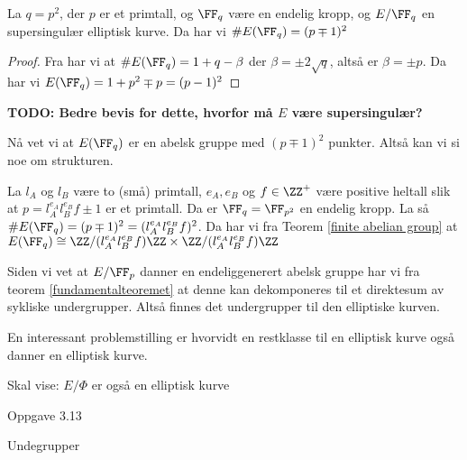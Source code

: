 
\begin{teorem}
La $q = p^2$, der $p$ er et primtall, og $\FF_q$ være en endelig kropp, og $E/\FF_q$ en supersingulær elliptisk kurve. Da har vi $\#E(\FF_q) = (p \mp 1)^2$

\begin{proof}
Fra \cite{elements_elliptic_curve} har vi at $\#E(\FF_q) = 1 + q - \beta$ der $\beta = \pm 2 \sqrt{q}$, altså er $\beta = \pm p$. Da har vi $E(\FF_q) = 1 + p^2 \mp p = (p-1)^2$
\end{proof} 
\textbf{TODO: Bedre bevis for dette, hvorfor må $E$ være supersingulær?}
\end{teorem}

Nå vet vi at $E(\FF_q)$ er en abelsk gruppe med $(p \mp 1)^2$ punkter. Altså kan vi si noe om strukturen.

\begin{eksempel}
La $l_A$ og $l_B$ være to (små) primtall, $e_A, e_B$ og $f \in \ZZ^+$ være positive heltall slik at $p = l_A^{e_A}l_B^{e_B}f \pm 1$ er et primtall. Da er $\FF_q = \FF_{p^2}$ en endelig kropp. La så $\#E(\FF_q) = (p \mp 1)^2 = (l_A^{e_A}l_B^{e_B}f)^2$. Da har vi fra Teorem \ref{finite abelian group} at $E(\FF_q) \cong \ZZ/(l_A^{e_A}l_B^{e_B}f)\ZZ \times \ZZ/(l_A^{e_A}l_B^{e_B}f)\ZZ$
\end{eksempel}

Siden vi vet at $E/\FF_p$ danner en endeliggenerert abelsk gruppe har vi fra teorem \ref{fundamentalteoremet} at denne kan dekomponeres til et direktesum av sykliske undergrupper. Altså finnes det undergrupper til den elliptiske kurven. 

En interessant problemstilling er hvorvidt en restklasse til en elliptisk kurve også danner en elliptisk kurve.


Skal vise:
$E/\Phi$ er også en elliptisk kurve

Oppgave 3.13

Undegrupper